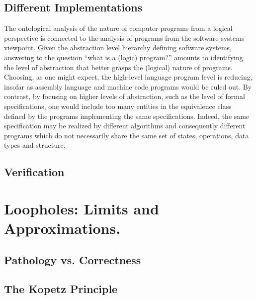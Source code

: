 \documentclass[]{article}
\begin{document}
\subsection{Different Implementations}

{\color{red}{GP?}}

The ontological analysis of the nature of computer programs from a logical perspective is connected to the analysis of programs from the software systems viewpoint. Given the abstraction level hierarchy defining software systems, answering to the question “what is a (logic) program?” amounts to identifying the level of abstraction that better grasps the (logical) nature of programs. Choosing, as one might expect,
the high-level language program level is reducing, insofar as assembly language and machine
code programs would be ruled out. By contrast, by focusing on higher levels of abstraction, such
as the level of formal specifications, one would include too many entities in the equivalence
class defined by the programs implementing the same specifications. Indeed, the same
specification may be realized by different algorithms and consequently different programs which
do not necessarily share the same set of states, operations, data types and structure.


\subsection{Verification}


{\color{red}{Note by Selmer on Different notions of Verification. Can he turn it into something that fits here?}}



\section{Loopholes: Limits and Approximations.}

\subsection{Pathology vs. Correctness}

{\color{red}{Liesbeth?}}



\subsection{The Kopetz Principle}%

{\color{red}{Passage inspired by Edgar}}
\end{document}

